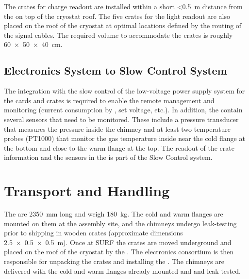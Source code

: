 The  crates for charge readout %
are installed within a short \SI{<0.5}{\meter} distance from the  on top of the cryostat roof. The five  crates for the light readout are also placed on the roof of the cryostat at optimal locations defined by the routing of the  signal cables. The required volume to accommodate the crates is roughly \SI[product-units=power]{60x50x40}{\cm}. 

\subsection{Electronics System to Slow Control System}
\label{sec:fddp-tpc-elec-intfc-sc}

The integration with the slow control of the low-voltage power supply system for the  cards and  crates is required to enable the remote management and monitoring (current consumption by , set voltage, etc.). In addition, the  contain several sensors that need to be monitored. These include a pressure transducer that measures the pressure inside the chimney and at least two temperature probes (PT1000) that monitor the gas temperature inside near the cold flange at the bottom and close to the warm flange at the top. The readout of the  crate information and the sensors in the  is part of the Slow Control system.

\section{Transport and Handling}
\label{sec:fddp-tpc-elec-install-transport}

The  are \SI{2350}{\mm} long %
and weigh \SI{180}{\kg}.  The cold and warm flanges are mounted on them at the assembly site, and the chimneys undergo leak-testing prior to shipping in wooden crates (approximate dimensions \SI[product-units=power]{2.5x0.5x0.5}{m}). %
Once at SURF the crates are moved underground and placed on the roof of the cryostat by the . The %
\dual electronics consortium %
is then responsible for unpacking the crates and installing the . The chimneys are delivered with the cold and warm flanges already mounted and and leak tested. %

